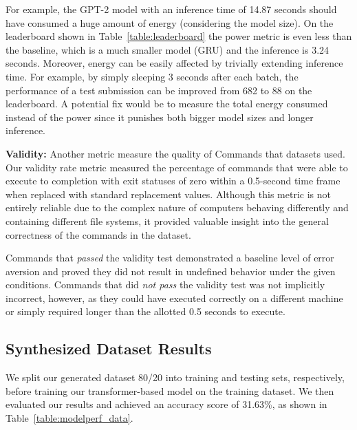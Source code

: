 \documentclass{river-journal}
\begin{document}
For example, the GPT-2 model with an inference time of 14.87 seconds should have consumed a huge amount of energy (considering the model size). On the leaderboard shown in Table~\ref{table:leaderboard} the power metric is even less than the baseline, which is a much smaller model (GRU) and the inference is 3.24 seconds. Moreover, energy can be easily affected by trivially extending inference time. For example, by simply sleeping 3 seconds after each batch, the performance of a test submission can be improved from 682 to 88 on the leaderboard. A potential fix would be to measure the total energy consumed instead of the power since it punishes both bigger model sizes and longer inference. 

\textbf{Validity:} Another metric measure the quality of Commands that datasets used. Our validity rate metric measured the percentage of commands that were able to execute to completion with exit statuses of zero within a 0.5-second time frame when replaced with standard replacement values. Although this metric is not entirely reliable due to the complex nature of computers behaving differently and containing different file systems, it provided valuable insight into the general correctness of the commands in the dataset. 

Commands that {\em passed} the validity test demonstrated a baseline level of error aversion and proved they did not result in undefined behavior under the given conditions. Commands that did {\em not pass} the validity test was not implicitly incorrect, however, as they could have executed correctly on a different machine or simply required longer than the allotted 0.5 seconds to execute. 

\subsection{Synthesized Dataset Results}
\label{section.result}

We split our generated dataset 80/20 into training and testing sets, respectively, before training our transformer-based model on the training dataset. We then evaluated our results and achieved an accuracy score of 31.63\%, as shown in Table~\ref{table:modelperf_data}. 
\end{document}
